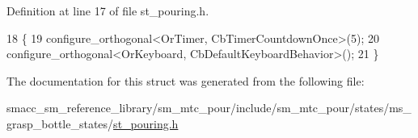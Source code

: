 Definition at line 17 of file st\+\_\+pouring.\+h.


\begin{DoxyCode}
18     \{
19         configure\_orthogonal<OrTimer,  CbTimerCountdownOnce>(5);    
20         configure\_orthogonal<OrKeyboard, CbDefaultKeyboardBehavior>();
21     \}
\end{DoxyCode}


The documentation for this struct was generated from the following file\+:\begin{DoxyCompactItemize}
\item 
smacc\+\_\+sm\+\_\+reference\+\_\+library/sm\+\_\+mtc\+\_\+pour/include/sm\+\_\+mtc\+\_\+pour/states/ms\+\_\+grasp\+\_\+bottle\+\_\+states/\hyperlink{st__pouring_8h}{st\+\_\+pouring.\+h}\end{DoxyCompactItemize}
